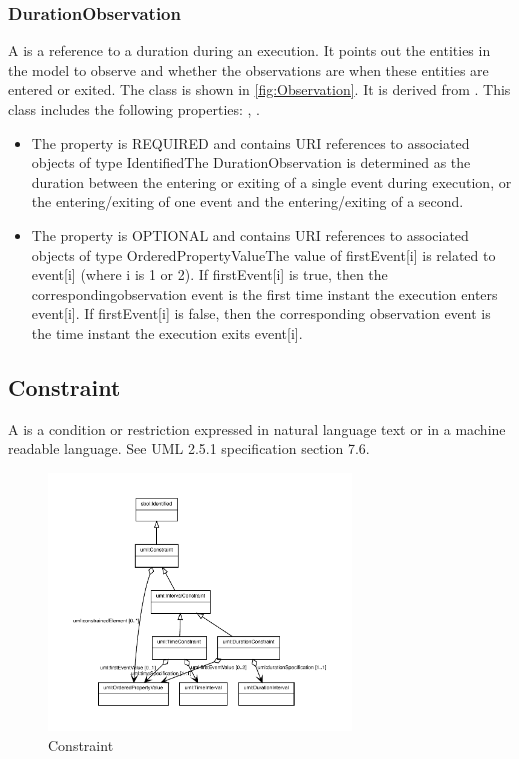 \subsubsection{DurationObservation}%
\label{sec:uml:DurationObservation}%
A  is a reference to a duration during an execution. It points out the entities in the model to observe and whether the observations are when these entities are entered or exited.%
\newline%
\linebreak%
The  class is shown in \ref{fig:Observation}. It is derived from .%
This class includes the following properties: , . %
\begin{itemize}%
\item%
The  property is REQUIRED and contains URI references to associated objects of type IdentifiedThe DurationObservation is determined as the duration between the entering or exiting of a single event during execution, or the entering/exiting of one event and the entering/exiting of a second.%
\item%
The  property is OPTIONAL and contains URI references to associated objects of type OrderedPropertyValueThe value of firstEvent[i] is related to event[i] (where i is 1 or 2). If firstEvent[i] is true, then the correspondingobservation event is the first time instant the execution enters event[i]. If firstEvent[i] is false, then the corresponding observation event is the time instant the execution exits event[i].%
\end{itemize}%
\subsection{Constraint}%
\label{sec:uml:Constraint}%
A  is a condition or restriction expressed in natural language text or in a machine readable language. See UML 2.5.1 specification section 7.6.%
\newline%
\linebreak%


\begin{figure}[h!]%
\centering%
\includegraphics[width=0.7178723404255319\textwidth]{uml_classes/Constraint_abstraction_hierarchy.pdf}%
\caption{Constraint}%
\label{fig:Constraint}%
\end{figure}

